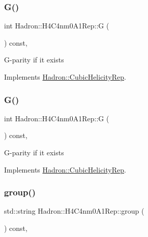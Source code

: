 \subsubsection{\texorpdfstring{G()}{G()}\hspace{0.1cm}{\footnotesize\ttfamily [1/2]}}
{\footnotesize\ttfamily int Hadron\+::\+H4\+C4nm0\+A1\+Rep\+::G (\begin{DoxyParamCaption}{ }\end{DoxyParamCaption}) const\hspace{0.3cm}{\ttfamily [inline]}, {\ttfamily [virtual]}}

G-\/parity if it exists 

Implements \mbox{\hyperlink{structHadron_1_1CubicHelicityRep_a50689f42be1e6170aa8cf6ad0597018b}{Hadron\+::\+Cubic\+Helicity\+Rep}}.

\mbox{\label{structHadron_1_1H4C4nm0A1Rep_a8982cc839b78b45f82c4361281a4c46a}} 
\subsubsection{\texorpdfstring{G()}{G()}\hspace{0.1cm}{\footnotesize\ttfamily [2/2]}}
{\footnotesize\ttfamily int Hadron\+::\+H4\+C4nm0\+A1\+Rep\+::G (\begin{DoxyParamCaption}{ }\end{DoxyParamCaption}) const\hspace{0.3cm}{\ttfamily [inline]}, {\ttfamily [virtual]}}

G-\/parity if it exists 

Implements \mbox{\hyperlink{structHadron_1_1CubicHelicityRep_a50689f42be1e6170aa8cf6ad0597018b}{Hadron\+::\+Cubic\+Helicity\+Rep}}.

\mbox{\label{structHadron_1_1H4C4nm0A1Rep_ac03a34ff386fa824b479f98878531f7b}} 
\subsubsection{\texorpdfstring{group()}{group()}\hspace{0.1cm}{\footnotesize\ttfamily [1/3]}}
{\footnotesize\ttfamily std\+::string Hadron\+::\+H4\+C4nm0\+A1\+Rep\+::group (\begin{DoxyParamCaption}{ }\end{DoxyParamCaption}) const\hspace{0.3cm}{\ttfamily [inline]}, {\ttfamily [virtual]}}

